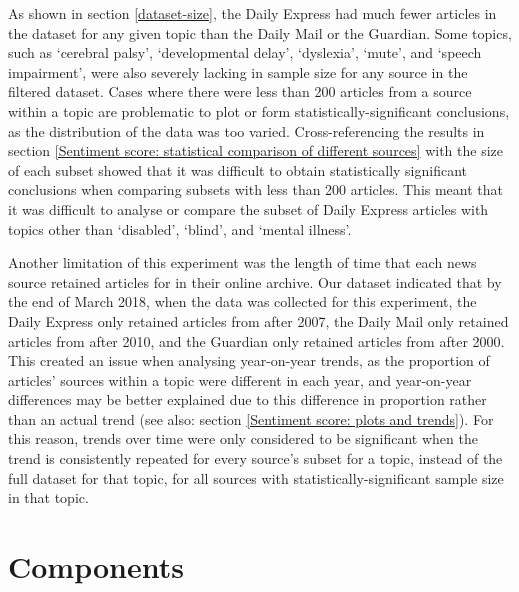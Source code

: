 \documentclass{report}
\newcommand{\textapprox}{\raisebox{0.5ex}{\texttildelow}}  %
\begin{document}
As shown in section \ref{dataset-size}, the Daily Express had much fewer articles in the dataset for any given topic than the Daily Mail or the Guardian.
Some topics, such as `cerebral palsy', `developmental delay', `dyslexia', `mute', and `speech impairment', were also severely lacking in sample size for any source in the filtered dataset.
Cases where there were less than \textapprox200 articles from a source within a topic are problematic to plot or form statistically-significant conclusions, as the distribution of the data was too varied.
Cross-referencing the results in section \ref{Sentiment score: statistical comparison of different sources} with the size of each subset showed that it was difficult to obtain statistically significant conclusions when comparing subsets with less than \textapprox200 articles.
This meant that it was difficult to analyse or compare the subset of Daily Express articles with topics other than `disabled', `blind', and `mental illness'.

Another limitation of this experiment was the length of time that each news source retained articles for in their online archive.
Our dataset indicated that by the end of March 2018, when the data was collected for this experiment, the Daily Express only retained articles from after \textapprox2007, the Daily Mail only retained articles from after \textapprox2010, and the Guardian only retained articles from after \textapprox2000. 
This created an issue when analysing year-on-year trends, as the proportion of articles' sources within a topic were different in each year, and year-on-year differences may be better explained due to this difference in proportion rather than an actual trend (see also: section \ref{Sentiment score: plots and trends}).
For this reason, trends over time were only considered to be significant when the trend is consistently repeated for every source's subset for a topic, instead of the full dataset for that topic, for all sources with statistically-significant sample size in that topic. 

\section{Components} \label{Components}
\end{document}
